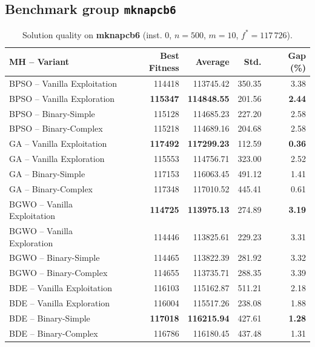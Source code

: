 \documentclass[journal,article,submit,moreauthors]{Definitions/mdpi}
\begin{document}
\clearpage
\subsection{Benchmark group \texttt{mknapcb6}}

\begin{table}[htbp]
  \centering
  \small
  \caption{Solution quality on \textbf{mknapcb6} (inst. 0, $n=500$, $m=10$, $f^*=117\,726$).}
  \label{tab:calidad_mknapcb6_0}
  \begin{tabular}{lrrrr}
    \toprule
    \textbf{MH -- Variant} &
    \textbf{Best Fitness} &
    \textbf{Average} &
    \textbf{Std.} &
    \textbf{Gap (\%)} \\
    \midrule
    BPSO -- Vanilla Exploitation &         114418 &        113745.42 & 350.35 &         3.38 \\
    BPSO -- Vanilla Exploration  & \textbf{115347} & \textbf{114848.55} & 201.56 & \textbf{2.44} \\
    BPSO -- Binary-Simple        &         115128 &        114685.23 & 227.20 &         2.58 \\
    BPSO -- Binary-Complex       &         115218 &        114689.16 & 204.68 &         2.58 \\
    \midrule
    GA -- Vanilla Exploitation   & \textbf{117492} & \textbf{117299.23} & 112.59 & \textbf{0.36} \\
    GA -- Vanilla Exploration    &         115553 &        114756.71 & 323.00 &         2.52 \\
    GA -- Binary-Simple          &         117153 &        116063.45 & 491.12 &         1.41 \\
    GA -- Binary-Complex         &         117348 &        117010.52 & 445.41 &         0.61 \\
    \midrule
    BGWO -- Vanilla Exploitation & \textbf{114725} & \textbf{113975.13} & 274.89 & \textbf{3.19} \\
    BGWO -- Vanilla Exploration  &         114446 &        113825.61 & 229.23 &         3.31 \\
    BGWO -- Binary-Simple        &         114465 &        113822.39 & 281.92 &         3.32 \\
    BGWO -- Binary-Complex       &         114655 &        113735.71 & 288.35 &         3.39 \\
    \midrule
    BDE -- Vanilla Exploitation  &         116103 &        115162.87 & 511.21 &         2.18 \\
    BDE -- Vanilla Exploration   &         116004 &        115517.26 & 238.08 &         1.88 \\
    BDE -- Binary-Simple         & \textbf{117018} & \textbf{116215.94} & 427.61 & \textbf{1.28} \\
    BDE -- Binary-Complex        &         116786 &        116180.45 & 437.48 &         1.31 \\
    \bottomrule
  \end{tabular}
\end{table}
\end{document}
